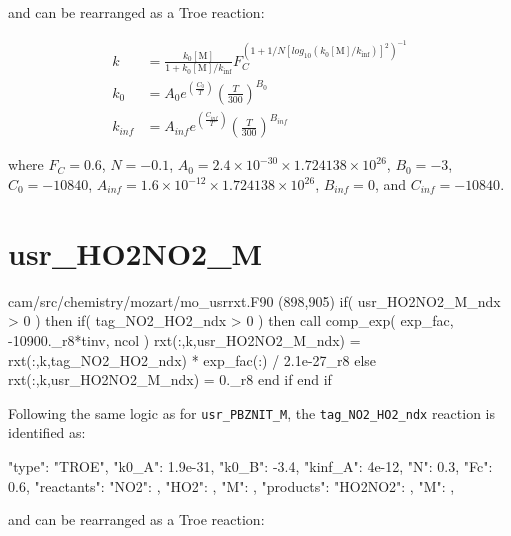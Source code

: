 \documentclass[titlepage]{article}
\begin{document}
\noindent and can be rearranged as a Troe reaction:

\begin{equation}
\begin{split}
k & = \frac{k_0[\mbox{M}]}{1+k_0[\mbox{M}]/k_{\inf}}F_C^{(1+1/N[log_{10}(k_0[\mbox{M}]/k_{\inf})]^2)^{-1}} \\
k_0 & = A_0 e^{\left( \frac{C_0}{T} \right)} \left( \frac{T}{300} \right)^{B_0} \\
k_{inf} & = A_{inf} e^{\left( \frac{C_{inf}}{T} \right)} \left( \frac{T}{300} \right)^{B_{inf}}
\end{split}
\end{equation}

\noindent where $F_C = 0.6$, $N = -0.1$, $A_0 = 2.4 \times 10^{-30} \times 1.724138 \times 10^{26}$, $B_0 = -3$, $C_0 = -10840$, $A_{inf} = 1.6 \times 10^{-12} \times 1.724138 \times 10^{26}$, $B_{inf} = 0$, and $C_{inf} = -10840$.


\section{usr\_HO2NO2\_M}

\begin{blockcode}[commandchars=\\\{\}]
\color{gray}cam/src/chemistry/mozart/mo_usrrxt.F90 (898,905)
       if( usr_HO2NO2_M_ndx > 0 ) then
          if( tag_NO2_HO2_ndx > 0 ) then
             call comp_exp( exp_fac, -10900._r8*tinv, ncol )
             rxt(:,k,usr_HO2NO2_M_ndx) = rxt(:,k,tag_NO2_HO2_ndx) * exp_fac(:) / 2.1e-27_r8
          else
             rxt(:,k,usr_HO2NO2_M_ndx) = 0._r8
          end if
       end if
\end{blockcode}

Following the same logic as for \verb>usr_PBZNIT_M>, the \verb>tag_NO2_HO2_ndx> reaction is identified as:

\begin{blockcode}
        {
          "type": "TROE",
          "k0_A": 1.9e-31,
          "k0_B": -3.4,
          "kinf_A": 4e-12,
          "N": 0.3,
          "Fc": 0.6,
          "reactants": {
            "NO2": { },
            "HO2": { },
            "M": { }
          },
          "products": {
            "HO2NO2": { },
            "M": { }
          }
        },
\end{blockcode}

\noindent and can be rearranged as a Troe reaction:
\end{document}

